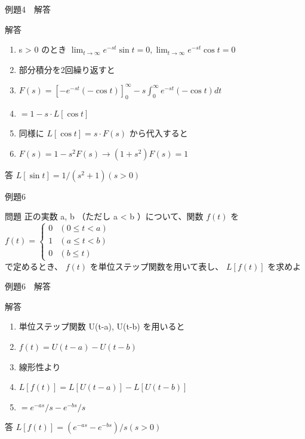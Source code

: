 \documentclass[aspectratio=43,professionalfonts,handout]{beamer}
\begin{document}
\begin{frame}{例題4　解答}
  \begin{exampleblock}{解答}
  \begin{enumerate}[1.]
    \item[] s > 0 のとき $\lim_{t \to \infty} e^{-st}\sin t = 0, \lim_{t \to \infty} e^{-st}\cos t = 0$
    \item[] 部分積分を2回繰り返すと
    \item[] $F(s) = [-e^{-st}(-\cos t)]_{0}^\infty - s\int_{0}^\infty e^{-st}(-\cos t)dt$
    \item[] $= 1 - s\cdot L[\cos t]$
    \item[] 同様に $L[\cos t] = s\cdot F(s)$ から代入すると
    \item[] $F(s) = 1 - s^{2}F(s)   \to   (1 + s^{2})F(s) = 1$
  \end{enumerate}
  \end{exampleblock}
  \begin{alertblock}{答}
    $L[\sin t] = 1/(s^{2}+1)  (s > 0)$
  \end{alertblock}
\end{frame}

\begin{frame}{例題6}
  \begin{exampleblock}{問題}
    正の実数 a, b （ただし a < b ）について、関数 $f(t)$ を\\[2pt]
    $f(t) = \begin{cases} 0 & (0 \leq t < a) \\ 1 & (a \leq t < b) \\ 0 & (b \leq t) \end{cases}$\\[2pt]
    で定めるとき、 $f(t)$ を単位ステップ関数を用いて表し、 $L[f(t)]$ を求めよ\\[2pt]
  \end{exampleblock}
\end{frame}

\begin{frame}{例題6　解答}
  \begin{exampleblock}{解答}
  \begin{enumerate}[1.]
    \item[] 単位ステップ関数 U(t-a), U(t-b) を用いると
    \item[] $f(t) = U(t-a) - U(t-b)$
    \item[] 線形性より
    \item[] $L[f(t)] = L[U(t-a)] - L[U(t-b)]$
    \item[] $= e^{-as}/s - e^{-bs}/s$
  \end{enumerate}
  \end{exampleblock}
  \begin{alertblock}{答}
    $L[f(t)] = (e^{-as} - e^{-bs})/s  (s > 0)$
  \end{alertblock}
\end{frame}
\end{document}
